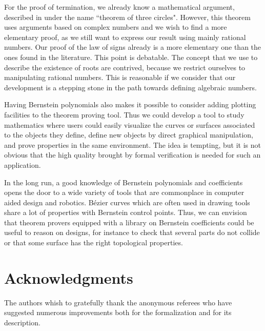 \documentclass{mscs}
\begin{document}
For the proof of termination, we already know a mathematical argument,
described in \cite{bpr} under the name ``theorem of three
circles". However, this theorem uses arguments based on complex
numbers and we wish to find a more elementary proof, as we still want
to express our result using mainly rational numbers.  Our proof of the
law of signs already is a more elementary one than the ones found in
the literature. This point is debatable. The concept that we use to
describe the existence of roots are contrived, because we restrict
ourselves to manipulating rational numbers. This is reasonable if we
consider that our development is a stepping stone in the path towards
defining algebraic numbers.

Having Bernstein polynomials also makes it possible to consider adding
plotting facilities to the theorem proving tool. Thus we could develop
a tool to study mathematics where users could easily visualize the
curves or surfaces associated to the objects they define, define new
objects by direct graphical manipulation, and prove properties in the
same environment. The idea is tempting, but it is not obvious that the
high quality brought by formal verification is needed for such an
application.

In the long run, a good knowledge of Bernstein polynomials and
coefficients opens the door to a wide variety of tools that are
commonplace in computer aided design and robotics. B\'ezier
curves which are often used in drawing tools share a lot of
properties with Bernstein control points. Thus, we can envision that
theorem provers equipped with a library on Bernstein coefficients
could be useful to reason on designs, for instance to check that
several parts do not collide or that some surface has the right
topological properties. %

\section{Acknowledgments} The authors whish to gratefully thank the
anonymous referees who have suggested numerous improvements both for
the formalization and for its description.



\end{document}
